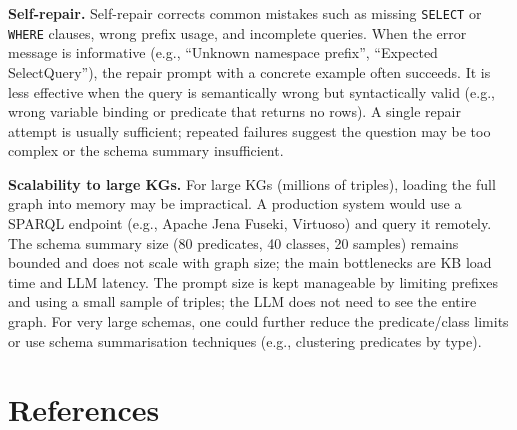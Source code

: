 \documentclass[11pt,a4paper]{article}
\begin{document}
  \textbf{Self-repair.} Self-repair corrects common mistakes such as missing \texttt{SELECT} or \texttt{WHERE} clauses, wrong prefix usage, and incomplete queries. When the error message is informative (e.g., ``Unknown namespace prefix'', ``Expected SelectQuery''), the repair prompt with a concrete example often succeeds. It is less effective when the query is semantically wrong but syntactically valid (e.g., wrong variable binding or predicate that returns no rows). A single repair attempt is usually sufficient; repeated failures suggest the question may be too complex or the schema summary insufficient.

  \textbf{Scalability to large KGs.} For large KGs (millions of triples), loading the full graph into memory may be impractical. A production system would use a SPARQL endpoint (e.g., Apache Jena Fuseki, Virtuoso) and query it remotely. The schema summary size (80 predicates, 40 classes, 20 samples) remains bounded and does not scale with graph size; the main bottlenecks are KB load time and LLM latency. The prompt size is kept manageable by limiting prefixes and using a small sample of triples; the LLM does not need to see the entire graph. For very large schemas, one could further reduce the predicate/class limits or use schema summarisation techniques (e.g., clustering predicates by type).

  \section{References}
\end{document}
